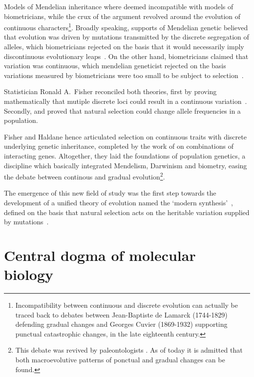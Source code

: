 Models of Mendelian inheritance where deemed incompatible with models of biometricians, while the crux of the argument revolved around the evolution of continuous characters\footnote{Incompatibility between continuous and discrete evolution can actually be traced back to debates between Jean-Baptiste de Lamarck (1744-1829) defending gradual changes and Georges Cuvier (1869-1932) supporting punctual catastrophic changes, in the late eighteenth century.}.
Broadly speaking, supports of Mendelian genetic believed that evolution was driven by mutations transmitted by the discrete segregation of \glspl{allele}, which biometricians rejected on the basis that it would necessarily imply discontinuous evolutionary leaps~\citep{bowler2003evolution}.
On the other hand, biometricians claimed that variation was continuous, which mendelian geneticist rejected on the basis variations measured by biometricians were too small to be subject to selection~\citep{provine2001origins}.

Statistician Ronald A.\ Fisher reconciled both theories, first by proving mathematically that mutiple discrete loci could result in a continuous variation~\citep{fisher1919xv}.
Secondly, \citet{fisher1930genetical} and \citet{haldane1932causes} proved that natural selection could change \gls{allele} frequencies in a population.

Fisher and Haldane hence articulated selection on continuous traits with discrete underlying genetic inheritance, completed by the work of \citet{wright1932roles} on combinations of interacting genes.
Altogether, they laid the foundations of population genetics, a discipline which basically integrated Mendelism, Darwinism and biometry, easing the debate between continous and gradual evolution\footnote{This debate was revived by paleontologists \citet*{Gould1972}.
As of today it is admitted that both macroevolutive patterns of ponctual and gradual changes can be found.}.

The emergence of this new field of study was the first step towards the development of a unified theory of evolution named the ‘modern synthesis’~\citep{huxley1942evolution}, defined on the basis that natural selection acts on the heritable variation supplied by mutations~\citep{mayr1959where,stebbins1966processes,dobzhansky1974chance}.

\section{Central dogma of molecular biology}

